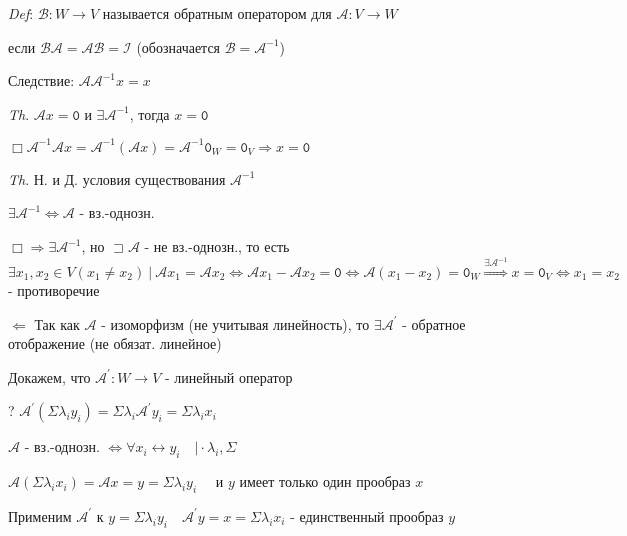 \documentclass[12pt]{article}
\begin{document}
    \vspace{3mm}
\textit{Def}: $\mathcal{B} : W \rightarrow V$ называется обратным оператором для $\mathcal{A} : V \rightarrow W$

    если $\mathcal{B}\mathcal{A} = \mathcal{A}\mathcal{B} = \mathcal{I}$ (обозначается $\mathcal{B} = \mathcal{A}^{-1}$)

    Следствие: $\mathcal{A}\mathcal{A}^{-1} x = x$

    \vspace{3mm}
\textit{Th}. $\mathcal{A}x = \texttt{0}$ и $\exists \mathcal{A}^{-1}$, тогда $x = \texttt{0}$

    $\Box \mathcal{A}^{-1}\mathcal{A} x = \mathcal{A}^{-1}(\mathcal{A} x) = \mathcal{A}^{-1} \texttt{0}_W = \texttt{0}_V \Longrightarrow x = \texttt{0}$

    \vspace{3mm}
\textit{Th}. Н. и Д. условия существования $\mathcal{A}^{-1}$

    $\exists \mathcal{A}^{-1} \Longleftrightarrow \mathcal{A}$ - вз.-однозн.

    $\Box \Longrightarrow \exists \mathcal{A}^{-1}$, но $\sqsupset \mathcal{A}$ - не вз.-однозн., то есть
    $\exists x_1, x_2 \in V (x_1 \neq x_2) \ | \ \mathcal{A}x_1 = \mathcal{A}x_2 \Longleftrightarrow \mathcal{A}x_1 - \mathcal{A}x_2 = \texttt{0} \Longleftrightarrow
    \mathcal{A}(x_1 - x_2) = \texttt{0}_W \stackrel{\exists \mathcal{A}^{-1}}{\Longrightarrow} x = \texttt{0}_V \Longleftrightarrow x_1 = x_2$ - противоречие

    $\Longleftarrow$ Так как $\mathcal{A}$ - изоморфизм (не учитывая линейность), то $\exists \mathcal{A}^\prime$ - обратное отображение (не обязат. линейное)

    Докажем, что $\mathcal{A}^\prime : W \rightarrow V$ - линейный оператор

    ? $\displaystyle \mathcal{A}^\prime (\Sigma \lambda_i y_i) = \Sigma \lambda_i \mathcal{A}^\prime y_i = \Sigma \lambda_i x_i$

    $\mathcal{A}$ - вз.-однозн. $\displaystyle \Longleftrightarrow \forall x_i \longleftrightarrow y_i \quad \Big| \cdot \lambda_i, \Sigma$

    $\displaystyle \mathcal{A}(\Sigma \lambda_i x_i) = \mathcal{A} x = y = \Sigma \lambda_i y_i \quad$ и $y$ имеет только один прообраз $x$

    Применим $\mathcal{A}^\prime$ к $\displaystyle y = \Sigma \lambda_i y_i \quad \mathcal{A}^\prime y = x = \Sigma \lambda_i x_i$ - единственный прообраз $y$
\end{document}
